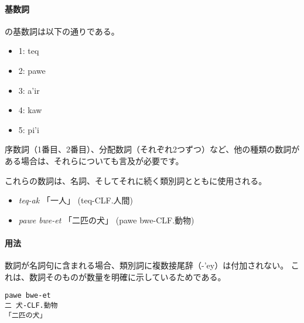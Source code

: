 \paragraph{基数詞}
\langname の基数詞は以下の通りである。
\begin{itemize}
    \item 1: teq
    \item 2: pawe
    \item 3: a'ir
    \item 4: kaw
    \item 5: pi'i
\end{itemize}

序数詞（1番目、2番目）、分配数詞（それぞれ2つずつ）など、他の種類の数詞がある場合は、それらについても言及が必要です。

これらの数詞は、名詞、そしてそれに続く類別詞とともに使用される。
\begin{itemize}
    \item \textit{teq-ak} 「一人」 (teq-CLF.人間)
    \item \textit{pawe bwe-et} 「二匹の犬」 (pawe bwe-CLF.動物)
\end{itemize}

\paragraph{用法}
数詞が名詞句に含まれる場合、類別詞に複数接尾辞（-'ey）は付加されない。
これは、数詞そのものが数量を明確に示しているためである。
\begin{verbatim}
pawe bwe-et
二 犬-CLF.動物
「二匹の犬」
\end{verbatim}
